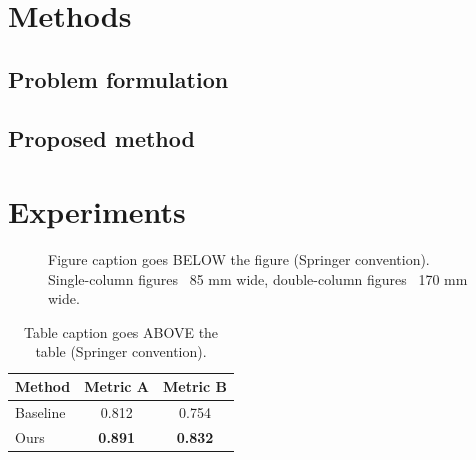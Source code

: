 \documentclass[11pt,a4paper]{article}
\begin{document}
\section{Methods}
\label{sec:methods}

\subsection{Problem formulation}

\subsection{Proposed method}

\section{Experiments}
\label{sec:experiments}

\begin{figure}[t]
\centering
\fbox{\rule{0pt}{5cm}\rule{0.7\textwidth}{0pt}}
\caption{Figure caption goes BELOW the figure (Springer convention).
Single-column figures ~85 mm wide, double-column figures ~170 mm wide.}
\label{fig:result}
\end{figure}

\begin{table}[t]
\caption{Table caption goes ABOVE the table (Springer convention).}
\label{tab:results}
\centering
\begin{tabular}{lcc}
\toprule
Method   & Metric A       & Metric B       \\
\midrule
Baseline & 0.812          & 0.754          \\
Ours     & \textbf{0.891} & \textbf{0.832} \\
\bottomrule
\end{tabular}
\end{table}

\end{document}

